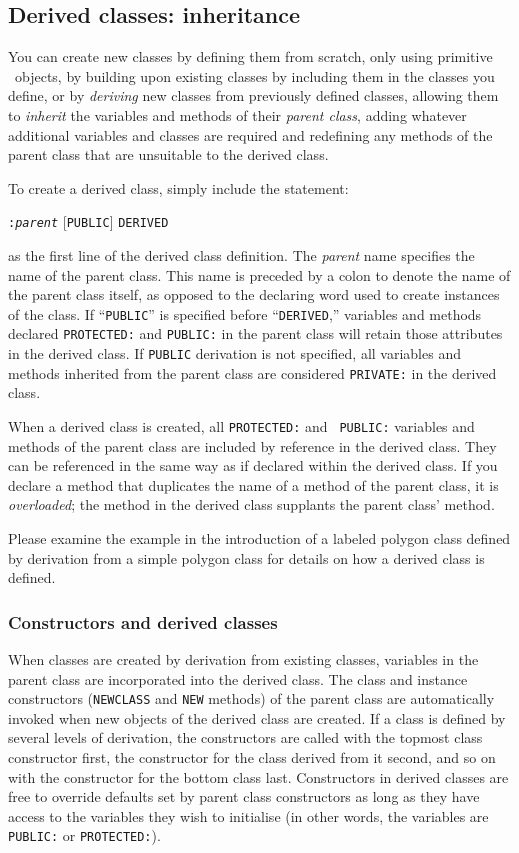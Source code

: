 \documentclass{article}
\begin{document}
\subsection{Derived classes: inheritance}

You can create new classes by defining them from scratch, only
using primitive \cw\ objects, by building upon existing classes by
including them in the classes you define, or by {\em deriving} new
classes from previously defined classes, allowing them to {\em
inherit} the variables and methods of their {\em parent class}, adding
whatever additional variables and classes are required and redefining
any methods of the parent class that are unsuitable to the derived
class.

To create a derived class, simply include the statement:

{\tt :{\em parent}} [{\tt PUBLIC}] {\tt DERIVED}

as the first line of the derived class definition.
The {\em parent} name specifies the name of the parent class.  This
name is preceded by a colon to denote the name of the parent class
itself, as opposed to the declaring word used to create instances of
the class.  If ``{\tt PUBLIC}'' is specified before ``{\tt DERIVED},''
variables and methods declared {\tt PROTECTED:} and {\tt PUBLIC:} in
the parent class will retain those attributes in the derived class.
If {\tt PUBLIC} derivation is not specified, all variables and methods
inherited from the parent class are considered {\tt PRIVATE:} in the
derived class.

When a derived class is created, all {\tt PROTECTED:} and {\tt
PUBLIC:} variables and methods of the parent class are included by
reference in the derived class.  They can be referenced in the same
way as if declared within the derived class.  If you declare
a method that duplicates the name of a method of the parent class, it
is {\em overloaded}; the method in the derived class supplants
the parent class' method.

Please examine the example in the introduction of a labeled polygon
class defined by derivation from a simple polygon class for details on
how a derived class is defined.

\subsubsection{Constructors and derived classes}

When classes are created by derivation from existing classes,
variables in the parent class are incorporated into the derived class.
The class and instance constructors ({\tt NEWCLASS} and {\tt NEW}
methods) of the parent class are automatically invoked when
new objects of the derived class are created.  If a class is
defined by several levels of derivation, the constructors are called
with the topmost class constructor first, the constructor for the
class derived from it second, and so on with the constructor for the
bottom class last.  Constructors in derived classes are free to
override defaults set by parent class constructors as long as they
have access to the variables they wish to initialise (in other words,
the variables are {\tt PUBLIC:} or {\tt PROTECTED:}).
\end{document}
